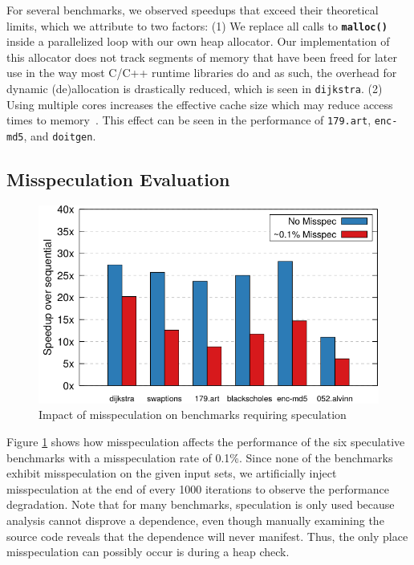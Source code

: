 For several benchmarks, we observed speedups that exceed their theoretical
limits, which we attribute to two factors:
(1) We replace all calls to \texttt{\textbf{malloc()}} inside a parallelized
loop with our own heap allocator. Our implementation of this allocator
does not track segments of memory that have been freed for later use in the
way most C/C++ runtime libraries do and as such, the overhead for dynamic
(de)allocation is drastically reduced, which is seen in \texttt{dijkstra}.
(2) Using multiple cores increases the effective cache size which may
reduce access times to memory~\cite{jeon:11:oopsla}. This effect can be
seen in the performance of \texttt{179.art}, \texttt{enc-md5}, and
\texttt{doitgen}.

\subsection{Misspeculation Evaluation}
\begin{figure}[htp]
  \includegraphics[width=\columnwidth]{figures/misspec-crop}
  \caption{Impact of misspeculation on benchmarks requiring speculation}
  \label{fig:misspec}
\end{figure}
Figure \ref{fig:misspec} shows how misspeculation affects the
performance of the six speculative benchmarks with a misspeculation rate of
0.1\%. Since none of the benchmarks exhibit misspeculation on the
given input sets, we artificially inject misspeculation at the end of
every 1000 iterations to observe the performance degradation.
Note that for many benchmarks, speculation is only used
because analysis cannot disprove a dependence, even though manually
examining the source code reveals that the dependence will never manifest.
Thus, the only place misspeculation can possibly occur is during a heap
check.
